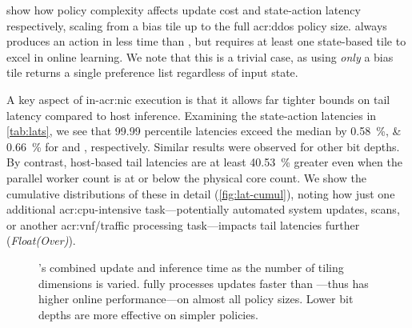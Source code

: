  show how policy complexity affects update cost and state-action latency respectively, scaling from a bias tile up to the full \gls{acr:ddos} policy size.
\Coopfw{} always produces an action in less time than \Indfw{}, but requires at least one state-based tile to excel in online learning.
We note that this is a trivial case, as using \emph{only} a bias tile returns a single preference list regardless of input state.

A key aspect of in-\gls{acr:nic} execution is that it allows far tighter bounds on tail latency compared to host inference.
Examining the state-action latencies in \cref{tab:lats}, we see that \num{99.99} percentile latencies exceed the median by \qtylist{0.58;0.66}{\percent} for \Indfw{} and \Coopfw{}, respectively.
Similar results were observed for other bit depths.
By contrast, host-based tail latencies are at least \qty{40.53}{\percent} greater even when the parallel worker count is at or below the physical core count.
We show the cumulative distributions of these in detail (\cref{fig:lat-cumul}), noting how just one additional \gls{acr:cpu}-intensive task---potentially automated system updates, scans, or another \gls{acr:vnf}/traffic processing task---impacts tail latencies further (\emph{Float(Over)}).

\begin{figure}
	\caption[\approachshort{}'s combined update and inference time as the number of tiling dimensions is varied.]{\approachshort{}'s combined update and inference time as the number of tiling dimensions is varied. \Coopfw{} fully processes updates faster than \Indfw{}---thus has higher online performance---on almost all policy sizes. Lower bit depths are more effective on simpler policies.\label{fig:vary-work}}
\end{figure}

